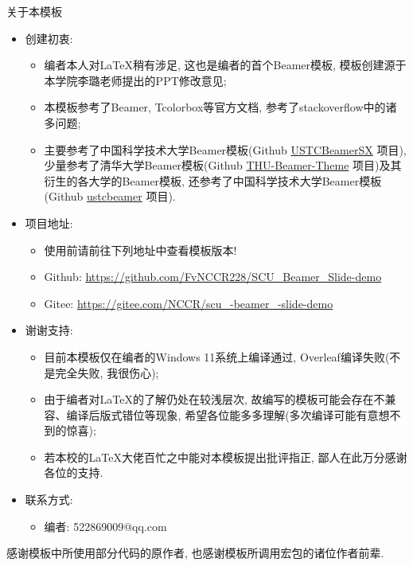 \documentclass[hyperref,UTF8,11pt]{beamer}
\begin{document}
\begin{frame}[allowframebreaks,t]{关于本模板}%
	\begin{itemize}
		\item 创建初衷:
		\begin{itemize}
			\item 编者本人对\LaTeX 稍有涉足, 这也是编者的首个Beamer模板, 模板创建源于本学院李璐老师提出的PPT修改意见;
			\item 本模板参考了Beamer, Tcolorbox等官方文档, 参考了stackoverflow中的诸多问题;
			\item 主要参考了中国科学技术大学Beamer模板(Github \href{https://github.com/ysx2000/USTCBeamerSX/}{\color{BSblue}USTCBeamerSX} 项目), 少量参考了清华大学Beamer模板(Github \href{https://github.com/tuna/THU-Beamer-Theme/}{\color{BSblue}THU-Beamer-Theme} 项目)及其衍生的各大学的Beamer模板, 还参考了中国科学技术大学Beamer模板(Github \href{https://github.com/ustctug/ustcbeamer/}{\color{BSblue}ustcbeamer} 项目).
		\end{itemize}
		\item 项目地址:
		\begin{itemize}
			\item 使用前请前往下列地址中查看模板版本!
			\item Github: {\color{BSblue}\url{https://github.com/FvNCCR228/SCU_Beamer_Slide-demo}}
			\item Gitee: \color{BSblue}\url{https://gitee.com/NCCR/scu_-beamer_-slide-demo}
		\end{itemize}
		\pagebreak
		\item 谢谢支持:
		\begin{itemize}
			\item 目前本模板仅在编者的Windows 11系统上编译通过, Overleaf编译失败(不是完全失败, 我很伤心);
			\item 由于编者对\LaTeX 的了解仍处在较浅层次, 故编写的模板可能会存在不兼容、编译后版式错位等现象, 希望各位能多多理解(多次编译可能有意想不到的惊喜);
			\item 若本校的\LaTeX 大佬百忙之中能对本模板提出批评指正, 鄙人在此万分感谢各位的支持.
		\end{itemize}
		\item 联系方式:
		\begin{itemize}
			\item 编者: 522869009@qq.com
		\end{itemize}
	\end{itemize}
	感谢模板中所使用部分代码的原作者, 也感谢模板所调用宏包的诸位作者前辈.
\end{frame}
\end{document}
